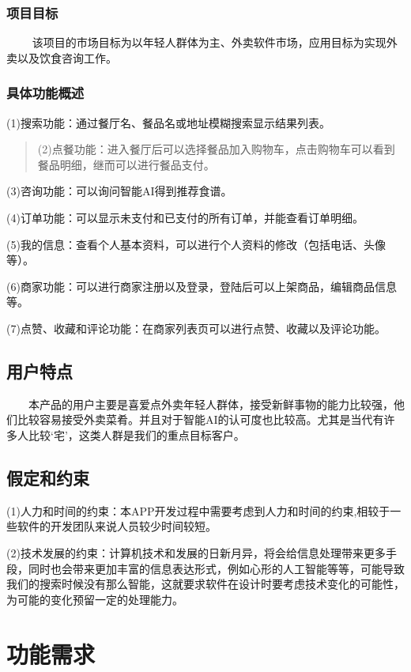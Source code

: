 \subsubsection{项目目标}

  
该项目的市场目标为以年轻人群体为主、外卖软件市场，应用目标为实现外卖以及饮食咨询工作。

\subsubsection{具体功能概述}


(1)搜索功能：通过餐厅名、餐品名或地址模糊搜索显示结果列表。

\begin{quote}
(2)点餐功能：进入餐厅后可以选择餐品加入购物车，点击购物车可以看到餐品明细，继而可以进行餐品支付。
\end{quote}

(3)咨询功能：可以询问智能AI得到推荐食谱。

(4)订单功能：可以显示未支付和已支付的所有订单，并能查看订单明细。

(5)我的信息：查看个人基本资料，可以进行个人资料的修改（包括电话、头像等）。

(6)商家功能：可以进行商家注册以及登录，登陆后可以上架商品，编辑商品信息等。

(7)点赞、收藏和评论功能：在商家列表页可以进行点赞、收藏以及评论功能。

\subsection{用户特点}

  本产品的用户主要是喜爱点外卖年轻人群体，接受新鲜事物的能力比较强，他们比较容易接受外卖菜肴。并且对于智能AI的认可度也比较高。尤其是当代有许多人比较`宅'，这类人群是我们的重点目标客户。

\subsection{假定和约束}


(1)人力和时间的约束：本APP开发过程中需要考虑到人力和时间的约束,相较于一些软件的开发团队来说人员较少时间较短。

(2)技术发展的约束：计算机技术和发展的日新月异，将会给信息处理带来更多手段，同时也会带来更加丰富的信息表达形式，例如心形的人工智能等等，可能导致我们的搜索时候没有那么智能，这就要求软件在设计时要考虑技术变化的可能性，为可能的变化预留一定的处理能力。

\section{功能需求}

